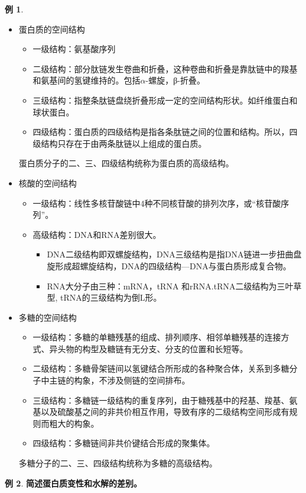 \documentclass[UTF8]{article}
\theoremstyle{definition}
\newtheorem{example}{例}[section]
\begin{document}
\begin{example}
    \begin{itemize}
    \item 蛋白质的空间结构
        \begin{itemize}
        \item 一级结构：氨基酸序列
        \item 二级结构：部分肽链发生卷曲和折叠，这种卷曲和折叠是靠肽链中的羧基和氨基间的氢键维持的。包括$\alpha$-螺旋，β-折叠。
        \item 三级结构：指整条肽链盘绕折叠形成一定的空间结构形状。如纤维蛋白和球状蛋白。
        \item 四级结构：蛋白质的四级结构是指各条肽链之间的位置和结构。所以，四级结构只存在于由两条肽链以上组成的蛋白质。
        \end{itemize}
        蛋白质分子的二、三、四级结构统称为蛋白质的高级结构。
    \item 核酸的空间结构\begin{itemize}
        \item 一级结构：线性多核苷酸链中4种不同核苷酸的排列次序，或“核苷酸序列”。
        \item 高级结构：DNA和RNA差别很大。\begin{itemize}
            \item DNA二级结构即双螺旋结构，DNA三级结构是指DNA链进一步扭曲盘旋形成超螺旋结构，DNA的四级结构---DNA与蛋白质形成复合物。
            \item RNA大分子由三种：mRNA，tRNA 和rRNA.tRNA二级结构为三叶草型, tRNA的三级结构为倒L形。
        \end{itemize} 
    \end{itemize}
    \item 多糖的空间结构\begin{itemize}
        \item 一级结构：多糖的单糖残基的组成、排列顺序、相邻单糖残基的连接方式、异头物的构型及糖链有无分支、分支的位置和长短等。
        \item 二级结构：多糖骨架链间以氢键结合所形成的各种聚合体，关系到多糖分子中主链的构象，不涉及侧链的空间排布。
        \item 三级结构：多糖链一级结构的重复序列，由于糖残基中的羟基、羧基、氨基以及硫酸基之间的非共价相互作用，导致有序的二级结构空间形成有规则而粗大的构象。
        \item 四级结构：多糖链间非共价键结合形成的聚集体。
    \end{itemize}
        多糖分子的二、三、四级结构统称为多糖的高级结构。
    \end{itemize}
\end{example}\begin{example}\textbf{简述蛋白质变性和水解的差别。}
    

\end{example}
\end{document}
